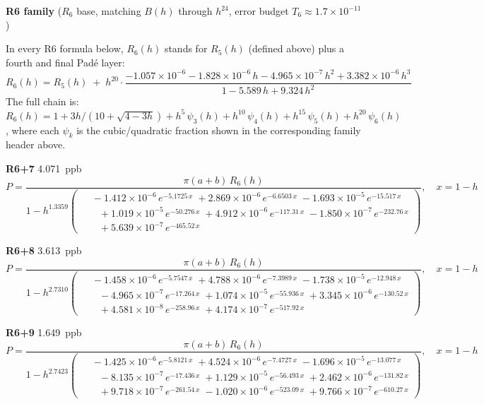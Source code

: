 \documentclass[12pt]{article}
\begin{document}
\medskip\noindent\textbf{R6 family} ($R_6$ base, matching $B(h)$ through $h^{24}$, error budget $T_6 \approx 1.7 \times 10^{-11}$)\nopagebreak

\noindent In every R6 formula below, $R_6(h)$ stands for $R_5(h)$ (defined above) plus a fourth and final Pad\'e layer:
\[
R_6(h) = R_5(h) \;+\; h^{20}\!\cdot\!\frac{-1.057{\times}10^{-6} - 1.828{\times}10^{-6}\,h - 4.965{\times}10^{-7}\,h^2 + 3.382{\times}10^{-6}\,h^3}
       {1 - 5.589\,h + 9.324\,h^2}
\]
The full chain is: $R_6(h) = 1 + 3h/(10{+}\sqrt{4{-}3h}) + h^5\,\psi_3(h) + h^{10}\,\psi_4(h) + h^{15}\,\psi_5(h) + h^{20}\,\psi_6(h)$, where each $\psi_k$ is the cubic/quadratic fraction shown in the corresponding family header above.

\noindent\textbf{R6+7} 4.071~ppb\nopagebreak
\begin{equation*}
P = \frac{\pi(a{+}b)\,R_6(h)}{1 - h^{1.3359}\!\left(\!\begin{aligned}
  &\; -1.412{\times}10^{-6}\,e^{-5.1725\,x} \; +2.869{\times}10^{-6}\,e^{-6.6503\,x} \; -1.693{\times}10^{-5}\,e^{-15.517\,x} \\[-3pt]
  &\quad +1.019{\times}10^{-5}\,e^{-50.276\,x} \; +4.912{\times}10^{-6}\,e^{-117.31\,x} \; -1.850{\times}10^{-7}\,e^{-232.76\,x} \\[-3pt]
  &\quad +5.639{\times}10^{-7}\,e^{-465.52\,x}
\end{aligned}\!\right)}, \quad x = 1{-}h
\end{equation*}

\noindent\textbf{R6+8} 3.613~ppb\nopagebreak
\begin{equation*}
P = \frac{\pi(a{+}b)\,R_6(h)}{1 - h^{2.7310}\!\left(\!\begin{aligned}
  &\; -1.458{\times}10^{-6}\,e^{-5.7547\,x} \; +4.788{\times}10^{-6}\,e^{-7.3989\,x} \; -1.738{\times}10^{-5}\,e^{-12.948\,x} \\[-3pt]
  &\quad -4.965{\times}10^{-7}\,e^{-17.264\,x} \; +1.074{\times}10^{-5}\,e^{-55.936\,x} \; +3.345{\times}10^{-6}\,e^{-130.52\,x} \\[-3pt]
  &\quad +4.581{\times}10^{-8}\,e^{-258.96\,x} \; +4.174{\times}10^{-7}\,e^{-517.92\,x}
\end{aligned}\!\right)}, \quad x = 1{-}h
\end{equation*}

\noindent\textbf{R6+9} 1.649~ppb\nopagebreak
\begin{equation*}
P = \frac{\pi(a{+}b)\,R_6(h)}{1 - h^{2.7423}\!\left(\!\begin{aligned}
  &\; -1.425{\times}10^{-6}\,e^{-5.8121\,x} \; +4.524{\times}10^{-6}\,e^{-7.4727\,x} \; -1.696{\times}10^{-5}\,e^{-13.077\,x} \\[-3pt]
  &\quad -8.135{\times}10^{-7}\,e^{-17.436\,x} \; +1.129{\times}10^{-5}\,e^{-56.493\,x} \; +2.462{\times}10^{-6}\,e^{-131.82\,x} \\[-3pt]
  &\quad +9.718{\times}10^{-7}\,e^{-261.54\,x} \; -1.020{\times}10^{-6}\,e^{-523.09\,x} \; +9.766{\times}10^{-7}\,e^{-610.27\,x}
\end{aligned}\!\right)}, \quad x = 1{-}h
\end{equation*}
\end{document}
